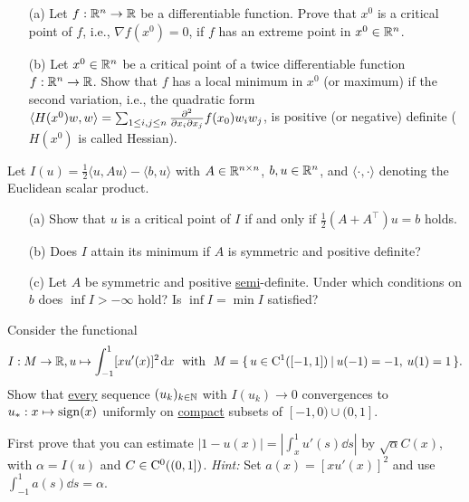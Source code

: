 \documentclass[12pt,a4paper]{article}
\begin{document}

\setcounter{AUFGABE}{0}

\begin{enumerate}
\item[(a)] Let $f:{\mathbb R}^n \to {\mathbb R}$ be a differentiable function.
Prove that $x^0$ is a critical point of $f$, i.e., $\nabla f(x^0)=0$,
if $f$ has an extreme point in $x^0 \in {\mathbb R}^n$.

\item[(b)] Let $x^0 \in {\mathbb R}^n$ be a critical point of a twice differentiable function $f: {\mathbb R}^n \to {\mathbb R}$. 
Show that $f$ has a local minimum in $x^0$ (or maximum)
if the second variation, i.e., the quadratic form 
$\langle H(x^0)w,w\rangle = \sum_{1\leq i,j\leq n}\frac{\partial^2}{\partial x_i\partial x_j}f(x_0)w_iw_j$,
is positive (or negative) definite ($H(x^0)$ is called Hessian).
\end{enumerate}



Let $I(u) = \frac{1}{2} \langle u,Au \rangle - \langle b,u \rangle$
with $A \in {\mathbb R}^{n \times n}$, $b,u \in {\mathbb R}^n$, and $\langle \cdot,\cdot \rangle$
denoting the Euclidean scalar product.
\begin{enumerate}
\item[(a)] Show that $u$ is a critical point of $I$ if and only if $\frac{1}{2}(A + A^\top)u = b$ holds.

\item[(b)] Does $I$ attain its minimum if $A$ is symmetric and positive definite?

\item[(c)] Let $A$ be symmetric and positive \underline{semi}-definite. Under which conditions on
$b$ does $\inf I > - \infty$ hold? 
Is  $\inf I = \min I$ satisfied?  
\end{enumerate}



Consider the functional
\[
I:M\to {\mathbb R}, u \mapsto \int_{-1}^1 [x u'(x)]^2 \;\!\mathrm{d} x \ \text{ with } \
M=\{\,  u\in {\mathrm C}^1([-1,1]) \: | \:  u(-1)=-1, \: u(1)=1 \,\}.
\]
Show that \underline{every} sequence 
$(u_k)_{k\in {\mathbb N}}$ with $I(u_k)\to 0$ convergences to 
$u_*:x\mapsto \mathop{\rm sign}(x)$ uniformly on \underline{compact} subsets of $[-1,0)\cup (0,1]$. 

First prove that you can estimate $|1{-}u(x)|=|\int_x^1 u'(s)\dd s|$ by 
$\sqrt\alpha C(x)$, with $\alpha =I(u)$ and $C \in {\mathrm C}^0((0,1])$. 
\textit{Hint:} Set $a(x)=[x u'(x)]^2$ and use $\int_{-1}^1 a(s)\dd
s=\alpha$. 
\end{document}
